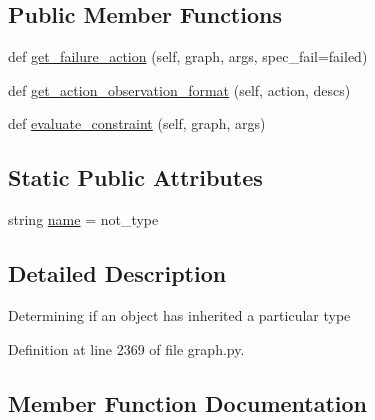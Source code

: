 \subsection*{Public Member Functions}
\begin{DoxyCompactItemize}
\item 
def \hyperlink{classlight__chats_1_1graph_1_1NotTypeConstraint_a006f37da6afe1dd06db790a6d19b07db}{get\+\_\+failure\+\_\+action} (self, graph, args, spec\+\_\+fail=\textquotesingle{}failed\textquotesingle{})
\item 
def \hyperlink{classlight__chats_1_1graph_1_1NotTypeConstraint_a5676df24e75c1823bd7b555a266de5f3}{get\+\_\+action\+\_\+observation\+\_\+format} (self, action, descs)
\item 
def \hyperlink{classlight__chats_1_1graph_1_1NotTypeConstraint_a14b047c243e378910ac24f6a2e7571e9}{evaluate\+\_\+constraint} (self, graph, args)
\end{DoxyCompactItemize}
\subsection*{Static Public Attributes}
\begin{DoxyCompactItemize}
\item 
string \hyperlink{classlight__chats_1_1graph_1_1NotTypeConstraint_afae4920597f8ab3937d3f172fceba01a}{name} = \textquotesingle{}not\+\_\+type\textquotesingle{}
\end{DoxyCompactItemize}


\subsection{Detailed Description}
\begin{DoxyVerb}Determining if an object has inherited a particular type\end{DoxyVerb}
 

Definition at line 2369 of file graph.\+py.



\subsection{Member Function Documentation}
\mbox{\label{classlight__chats_1_1graph_1_1NotTypeConstraint_a14b047c243e378910ac24f6a2e7571e9}} 
